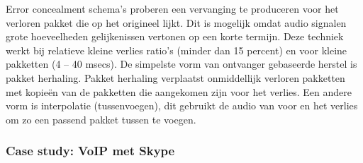Error concealment schema’s proberen een vervanging te produceren voor het verloren pakket die op het origineel lijkt. Dit is mogelijk omdat audio signalen grote hoeveelheden gelijkenissen vertonen op een korte termijn. Deze techniek werkt bij relatieve kleine verlies ratio’s (minder dan 15 percent) en voor kleine pakketten (4 – 40 msecs). De simpelste vorm van ontvanger gebaseerde herstel is pakket herhaling. Pakket herhaling verplaatst onmiddellijk verloren pakketten met kopieën van de pakketten die aangekomen zijn voor het verlies. Een andere vorm is interpolatie (tussenvoegen), dit gebruikt de audio van voor en het verlies om zo een passend pakket tussen te voegen.

\subsubsection{Case study: VoIP met Skype}

